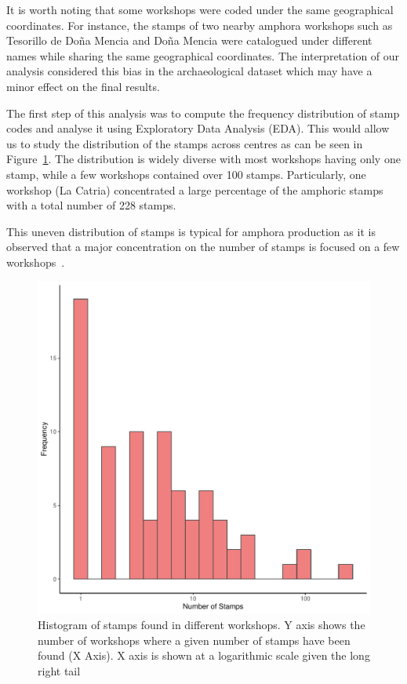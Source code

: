 
It is worth noting that some workshops were coded under the same geographical coordinates. For instance, the stamps of two nearby amphora workshops such as Tesorillo de Do\~na Mencia and Do\~na Mencia were catalogued under different names while sharing the same geographical coordinates. The interpretation of our analysis considered this bias in the archaeological dataset which may have a minor effect on the final results. 

The first step of this analysis was to compute the frequency distribution of stamp codes and analyse it using Exploratory Data Analysis (EDA). This would allow us to study the distribution of the stamps across centres as can be seen in Figure~\ref{stamps}. The distribution is widely diverse with most workshops having only one stamp, while a few workshops contained over 100 stamps. Particularly, one workshop (La Catria) concentrated a large percentage of the amphoric stamps with a total number of 228 stamps.

This uneven distribution of stamps is typical for amphora production as it is observed that a major concentration on the number of stamps is focused on a few workshops~\citep{bayesian_2018,coto-sarmiento_identifying_2018}.

\begin{figure}[htp]
	\centering
\includegraphics[width=\linewidth]{frequencystamp.pdf}
\caption{Histogram of stamps found in different workshops. Y axis shows the number of workshops where a given number of stamps have been found (X Axis). X axis is shown at a logarithmic scale given the long right tail}
\label{stamps}
\end{figure} 

